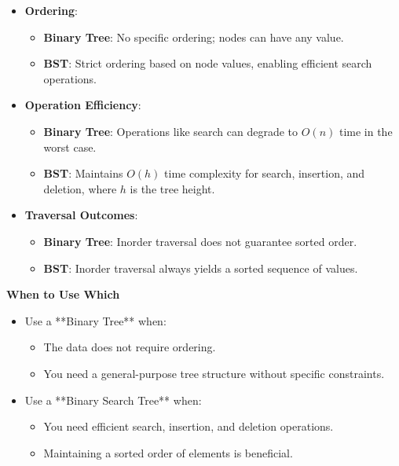 \begin{itemize}
    \item \textbf{Ordering}:
    \begin{itemize}
        \item \textbf{Binary Tree}: No specific ordering; nodes can have any value.
        \item \textbf{BST}: Strict ordering based on node values, enabling efficient search operations.
    \end{itemize}
    
    \item \textbf{Operation Efficiency}:
    \begin{itemize}
        \item \textbf{Binary Tree}: Operations like search can degrade to \(O(n)\) time in the worst case.
        \item \textbf{BST}: Maintains \(O(h)\) time complexity for search, insertion, and deletion, where \(h\) is the tree height.
    \end{itemize}
    
    \item \textbf{Traversal Outcomes}:
    \begin{itemize}
        \item \textbf{Binary Tree}: Inorder traversal does not guarantee sorted order.
        \item \textbf{BST}: Inorder traversal always yields a sorted sequence of values.
    \end{itemize}
\end{itemize}

\textbf{When to Use Which}

\begin{itemize}
    \item Use a **Binary Tree** when:
    \begin{itemize}
        \item The data does not require ordering.
        \item You need a general-purpose tree structure without specific constraints.
    \end{itemize}
    
    \item Use a **Binary Search Tree** when:
    \begin{itemize}
        \item You need efficient search, insertion, and deletion operations.
        \item Maintaining a sorted order of elements is beneficial.
    \end{itemize}
\end{itemize}

